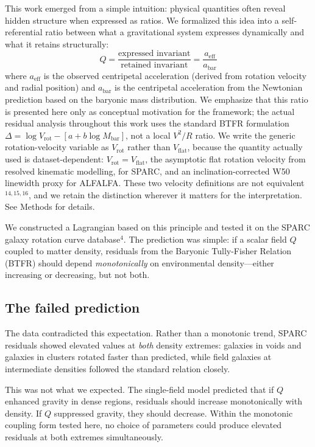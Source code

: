 \documentclass[11pt,a4paper]{article}
\begin{document}
This work emerged from a simple intuition: physical quantities often reveal hidden structure when expressed as ratios. We formalized this idea into a self-referential ratio between what a gravitational system expresses dynamically and what it retains structurally:
\begin{equation}
Q = \frac{\text{expressed invariant}}{\text{retained invariant}} = \frac{a_{\mathrm{eff}}}{a_{\mathrm{bar}}}
\end{equation}
where $a_{\mathrm{eff}}$ is the observed centripetal acceleration (derived from rotation velocity and radial position) and $a_{\mathrm{bar}}$ is the centripetal acceleration from the Newtonian prediction based on the baryonic mass distribution. We emphasize that this ratio is presented here only as conceptual motivation for the framework; the actual residual analysis throughout this work uses the standard BTFR formulation $\Delta = \log V_{\mathrm{rot}} - [a + b \log M_{\mathrm{bar}}]$, not a local $V^2/R$ ratio. We write the generic rotation-velocity variable as $V_{\mathrm{rot}}$ rather than $V_{\mathrm{flat}}$, because the quantity actually used is dataset-dependent: $V_{\mathrm{rot}} = V_{\mathrm{flat}}$, the asymptotic flat rotation velocity from resolved kinematic modelling, for SPARC, and an inclination-corrected W50 linewidth proxy for ALFALFA. These two velocity definitions are not equivalent$^{14,15,16}$, and we retain the distinction wherever it matters for the interpretation. See Methods for details.

We constructed a Lagrangian based on this principle and tested it on the SPARC galaxy rotation curve database$^{4}$. The prediction was simple: if a scalar field $Q$ coupled to matter density, residuals from the Baryonic Tully-Fisher Relation (BTFR) should depend \textit{monotonically} on environmental density---either increasing or decreasing, but not both.

\subsection*{The failed prediction}

The data contradicted this expectation. Rather than a monotonic trend, SPARC residuals showed elevated values at \textit{both} density extremes: galaxies in voids and galaxies in clusters rotated faster than predicted, while field galaxies at intermediate densities followed the standard relation closely.

This was not what we expected. The single-field model predicted that if $Q$ enhanced gravity in dense regions, residuals should increase monotonically with density. If $Q$ suppressed gravity, they should decrease. Within the monotonic coupling form tested here, no choice of parameters could produce elevated residuals at both extremes simultaneously.
\end{document}
